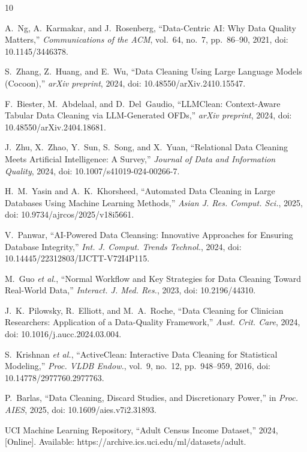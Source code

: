 \documentclass[conference]{IEEEtran}
\begin{document}
\begin{thebibliography}{10}

A.~Ng, A.~Karmakar, and J.~Rosenberg,
``Data-Centric AI: Why Data Quality Matters,''
\textit{Communications of the ACM},
vol.~64, no.~7, pp.~86--90, 2021,
doi: 10.1145/3446378.

S.~Zhang, Z.~Huang, and E.~Wu,
``Data Cleaning Using Large Language Models (Cocoon),''
\textit{arXiv preprint}, 2024,
doi: 10.48550/arXiv.2410.15547.

F.~Biester, M.~Abdelaal, and D.~Del~Gaudio,
``LLMClean: Context-Aware Tabular Data Cleaning via LLM-Generated OFDs,''
\textit{arXiv preprint}, 2024,
doi: 10.48550/arXiv.2404.18681.

J.~Zhu, X.~Zhao, Y.~Sun, S.~Song, and X.~Yuan,
``Relational Data Cleaning Meets Artificial Intelligence: A Survey,''
\textit{Journal of Data and Information Quality}, 2024,
doi: 10.1007/s41019-024-00266-7.

H.~M.~Yasin and A.~K.~Khorsheed,
``Automated Data Cleaning in Large Databases Using Machine Learning Methods,''
\textit{Asian J. Res. Comput. Sci.}, 2025,
doi: 10.9734/ajrcos/2025/v18i5661.

V.~Panwar,
``AI-Powered Data Cleansing: Innovative Approaches for Ensuring Database Integrity,''
\textit{Int. J. Comput. Trends Technol.}, 2024,
doi: 10.14445/22312803/IJCTT-V72I4P115.

M.~Guo \textit{et al.},
``Normal Workflow and Key Strategies for Data Cleaning Toward Real-World Data,''
\textit{Interact. J. Med. Res.}, 2023,
doi: 10.2196/44310.

J.~K.~Pilowsky, R.~Elliott, and M.~A.~Roche,
``Data Cleaning for Clinician Researchers: Application of a Data-Quality Framework,''
\textit{Aust. Crit. Care}, 2024,
doi: 10.1016/j.aucc.2024.03.004.

S.~Krishnan \textit{et al.},
``ActiveClean: Interactive Data Cleaning for Statistical Modeling,''
\textit{Proc. VLDB Endow.}, vol.~9, no.~12, pp.~948--959, 2016,
doi: 10.14778/2977760.2977763.

P.~Barlas,
``Data Cleaning, Discard Studies, and Discretionary Power,''
in \textit{Proc. AIES}, 2025,
doi: 10.1609/aies.v7i2.31893.

UCI Machine Learning Repository,
``Adult Census Income Dataset,''
2024, [Online]. Available: https://archive.ics.uci.edu/ml/datasets/adult.

\end{thebibliography}
\end{document}
